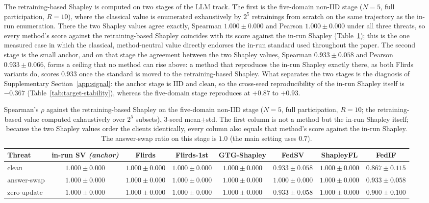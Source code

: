 \documentclass[letterpaper]{article} %
\theoremstyle{plain}
\begin{document}
The retraining-based Shapley is computed on two stages of the LLM track. The
first is the five-domain non-IID stage ($N{=}5$, full participation,
$R{=}10$), where the classical value is enumerated exhaustively by $2^5$
retrainings from scratch on the same trajectory as the in-run enumeration.
There the two Shapley values agree exactly, Spearman $1.000\pm0.000$ and
Pearson $1.000\pm0.000$ under all three threats, so every method's score
against the retraining-based Shapley coincides with its score against the
in-run Shapley (Table~\ref{tab:silo-retrain}); this is the one measured case
in which the classical, method-neutral value directly endorses the in-run
standard used throughout the paper. The second stage is the small anchor,
and on that stage the agreement between the two Shapley values, Spearman
$0.933\pm0.058$ and Pearson $0.933\pm0.066$, forms a ceiling that no method
can rise above: a method that reproduces the in-run Shapley exactly there, as
both Flirds variants do, scores $0.933$ once the standard is moved to the
retraining-based Shapley. What separates the two stages is the
diagnosis of Supplementary Section~\ref{app:signal}: the anchor stage is IID
and clean, so the cross-seed reproducibility of the in-run Shapley itself is
$-0.367$ (Table~\ref{tab:target-stability}), whereas the five-domain stage
reproduces at $+0.87$ to $+0.93$.

\begin{table}[t]
\centering
\small
\setlength{\tabcolsep}{3.5pt}
\caption{Spearman's $\rho$ against the retraining-based Shapley on the
five-domain non-IID stage ($N{=}5$, full participation, $R{=}10$; the
retraining-based value computed exhaustively over $2^5$ subsets), 3-seed
mean$\pm$std. The first column is not a method but the in-run Shapley
itself; because the two Shapley values order the clients identically, every
column also equals that method's score against the in-run Shapley. The
answer-swap ratio on this stage is $1.0$ (the main setting uses $0.7$).}
\label{tab:silo-retrain}
\begin{tabular}{lccccccc}
\hline
Threat & in-run SV \emph{(anchor)} & Flirds & Flirds-1st & GTG-Shapley & FedSV & ShapleyFL & FedIF \\
\hline
clean & $1.000\pm0.000$ & $1.000\pm0.000$ & $1.000\pm0.000$ & $1.000\pm0.000$ & $0.933\pm0.058$ & $1.000\pm0.000$ & $0.867\pm0.115$ \\
answer-swap & $1.000\pm0.000$ & $1.000\pm0.000$ & $1.000\pm0.000$ & $1.000\pm0.000$ & $1.000\pm0.000$ & $1.000\pm0.000$ & $0.933\pm0.058$ \\
zero-update & $1.000\pm0.000$ & $1.000\pm0.000$ & $1.000\pm0.000$ & $1.000\pm0.000$ & $0.933\pm0.058$ & $1.000\pm0.000$ & $0.900\pm0.100$ \\
\hline
\end{tabular}
\end{table}
\end{document}
